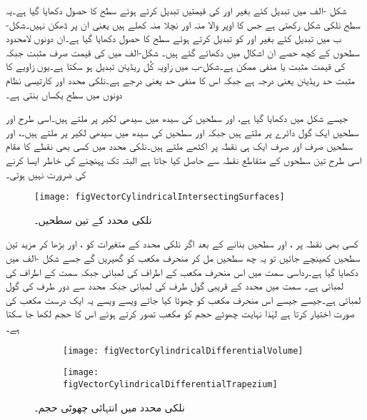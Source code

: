 شکل -الف میں  تبدیل کئے بغیر  اور  کی قیمتیں تبدیل کرتے ہوئے  سطح کا حصول دکھایا گیا ہے۔یہ سطح نلکی شکل رکھتی ہے  جس کا اوپر والا منہ اور نچلا منہ کھلے ہیں یعنی ان پر ڈھکن نہیں۔شکل-ب میں  تبدیل کئے بغیر  اور  کو تبدیل کرتے ہوئے  سطح کا حصول دکھایا گیا ہے۔ان دونوں لامحدود سطحوں کے کچھ حصے ان  اشکال میں  دکھائے گئے ہیں۔ شکل-الف میں  کی قیمت صرف مثبت جبکہ  کی قیمت مثبت یا منفی ممکن ہے۔شکل-ب میں زاویہ کُل  ریڈیئن تبدیل ہو سکتا ہے۔یوں زاویے کا مثبت حد  ریڈیئن یعنی  درجہ ہے جبکہ اس کا منفی حد  یعنی  درجے ہے۔نلکی محدد اور کارتیسی نظام دونوں میں   سطح یکساں بنتی ہے۔

جیسے شکل  میں دکھایا گیا ہے،  اور   سطحیں  کی سیدھ میں سیدھی لکیر پر ملتے ہیں۔اسی طرح  اور  سطحیں ایک گول دائرے پر ملتے ہیں جبکہ  اور  سطحیں  کی سیدھ میں سیدھی لکیر پر ملتے ہیں۔،  اور  سطحیں صرف اور صرف ایک ہی نقطہ  پر اکٹھے ملتے ہیں۔نلکی محدد میں کسی بھی نقطے  کا مقام اسی طرح تین سطحوں کے  متقاطع نقطہ سے حاصل کیا جاتا ہے البتہ  تک پہنچنے کی خاطر ایسا کرنے کی ضرورت نہیں ہوتی۔

\begin{figure}
\centering
\texttt{[image: figVectorCylindricalIntersectingSurfaces]}
\caption{نلکی محدد کے تین سطحیں۔}
\label{شکل_سمتیہ_نلکی_تین_سطحیں}
\end{figure}
کسی بھی نقطہ  پر ،  اور  سطحیں  بنانے کے بعد اگر نلکی محدد کے متغیرات کو ،  اور  بڑھا کر مزید تین سطحیں کھینچے جائیں تو یہ چھ سطحیں مل کر منحرف مکعب کو گھیریں گے جسے شکل -الف میں دکھایا گیا ہے۔رداسی سمت میں اس منحرف مکعب کے اطراف کی لمبائی  جبکہ   سمت کے اطراف کی لمبائی  ہے۔  سمت میں  محدد کے قریبی  گول طرف کی لمبائی  جبکہ محدد سے دور طرف کی گول لمبائی  ہے۔جیسے جیسے اس منحرف مکعب کو چھوٹا کیا جائے ویسے ویسے یہ ایک درست مکعب کی صورت اختیار کرتا ہے لہٰذا نہایت چھوٹے حجم کو مکعب تصور کرتے ہوئے اس کا حجم  لکھا جا سکتا ہے۔
\begin{figure}
\centering
\begin{subfigure}{0.5\textwidth}
\centering
\texttt{[image: figVectorCylindricalDifferentialVolume]}
\end{subfigure}%
%
\begin{subfigure}{0.5\textwidth}
\centering
\texttt{[image: figVectorCylindricalDifferentialTrapezium]}
\end{subfigure}%
\caption{نلکی محدد میں انتہائی چھوٹی حجم۔}
\label{شکل_سمتیہ_نلکی_چھوٹی_حجم}
\end{figure}  

